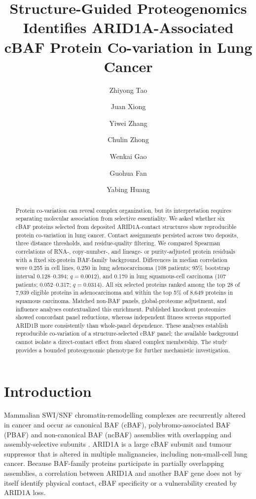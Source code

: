\documentclass[journal=jprobs,manuscript=article,layout=traditional]{achemso}
\author{Zhiyong Tao}
\author{Juan Xiong}
\author{Yiwei Zhang}
\author{Chulin Zhong}
\author{Wenkai Gao}
\author{Guohua Fan}
\author{Yabing Huang}
\affiliation{Department of Pathology, Renmin Hospital of Wuhan University, Wuhan 430060, China}
\title{Structure-Guided Proteogenomics Identifies ARID1A-Associated cBAF Protein Co-variation in Lung Cancer}
\begin{document}
\begin{abstract}
Protein co-variation can reveal complex organization, but its interpretation requires separating molecular association from selective essentiality. We asked whether six cBAF proteins selected from deposited ARID1A-contact structures show reproducible protein co-variation in lung cancer. Contact assignments persisted across two deposits, three distance thresholds, and residue-quality filtering. We compared Spearman correlations of RNA-, copy-number-, and lineage- or purity-adjusted protein residuals with a fixed six-protein BAF-family background. Differences in median correlation were 0.255 in cell lines, 0.250 in lung adenocarcinoma (108 patients; 95\% bootstrap interval 0.128--0.394; $q=0.0012$), and 0.170 in lung squamous-cell carcinoma (107 patients; 0.052--0.317; $q=0.0314$). All six selected proteins ranked among the top 28 of 7,939 eligible proteins in adenocarcinoma and within the top 5\% of 8,649 proteins in squamous carcinoma. Matched non-BAF panels, global-proteome adjustment, and influence analyses contextualized this enrichment. Published knockout proteomics showed concordant panel reductions, whereas independent fitness screens supported ARID1B more consistently than whole-panel dependence. These analyses establish reproducible co-variation of a structure-selected cBAF panel; the available background cannot isolate a direct-contact effect from shared complex membership. The study provides a bounded proteogenomic phenotype for further mechanistic investigation.
\end{abstract}

\section{Introduction}

Mammalian SWI/SNF chromatin-remodelling complexes are recurrently altered in cancer and occur as canonical BAF (cBAF), polybromo-associated BAF (PBAF) and non-canonical BAF (ncBAF) assemblies with overlapping and assembly-selective subunits \citep{kadoch2013,mashtalir2018,michel2018,wanior2021}. ARID1A is a large cBAF subunit and tumour suppressor that is altered in multiple malignancies, including non-small-cell lung cancer. Because BAF-family proteins participate in partially overlapping assemblies, a correlation between ARID1A and another BAF gene does not by itself identify physical contact, cBAF specificity or a vulnerability created by ARID1A loss.
\end{document}
